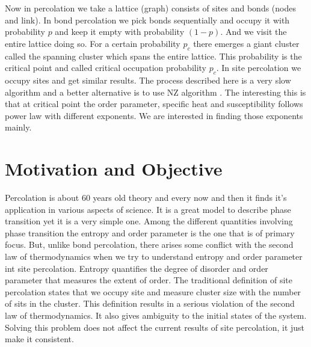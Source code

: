 	 Now in percolation we take a lattice (graph) consists of sites and bonds (nodes and link). In bond percolation we pick bonds sequentially and occupy it with probability $p$ and keep it empty with probability $(1-p)$. And we visit the entire lattice doing so. For a certain probability $p_c$ there emerges a giant cluster called the spanning cluster which spans the entire lattice. This probability is the critical point and called critical occupation probability $p_c$. In site percolation we occupy sites and get similar results. The process described here is a very slow algorithm and a better alternative is to use NZ algorithm \cite{Newman2000, Newman2001}. The interesting this is that at critical point the order parameter, specific heat and susceptibility follows power law with different exponents. We are interested in finding those exponents mainly.
	 
	 



\section{Motivation and Objective} 
	Percolation is about $60$ years old theory and every now and then it finds it's application in various aspects of science. It is a great model to describe phase transition yet it is a very simple one. Among the different quantities involving phase transition the entropy and order parameter is the one that is of primary focus. But, unlike bond percolation, there arises some conflict with the second law of thermodynamics when we try to understand entropy and order parameter int site percolation. Entropy quantifies the degree of disorder and order parameter that measures the extent of order. 	The traditional definition of site percolation states that we occupy site and measure cluster size with the number of sits in the cluster. This definition results in a serious violation of the second law of thermodynamics. It also gives ambiguity to the initial states of the system. Solving this problem does not affect the current results of site percolation, it just make it consistent.\\
	
